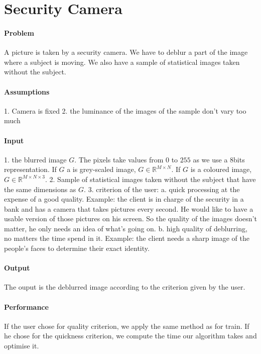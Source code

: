 \section{Security Camera}

\paragraph{Problem}
A picture is taken by a security camera. We have to deblur a part of the image where a subject is moving. We also have a sample of statistical images taken without the subject.

\paragraph{Assumptions}
1. Camera is fixed 2. the luminance of the images of the sample don't vary too much

\paragraph{Input}
1. the blurred image $G$. The pixels take values from $0$ to $255$ as we use a 8bits representation. If $G$ a is grey-scaled image, $G \in \mathbb{R}^{M \times N}$. If $G$ is a coloured image, $G \in \mathbb{R}^{M \times N \times 3}$. 2. Sample of statistical images taken without the subject that have the same dimensions as $G$. 3. criterion of the user: a. quick processing at the expense of a good quality. Example: the client is in charge of the security in a bank and has a camera that takes pictures every second. He would like to have a usable version of those pictures on his screen. So the quality of the images doesn't matter, he only needs an idea of what's going on. b. high quality of deblurring, no matters the time spend in it. Example: the client needs a sharp image of the people's faces to determine their exact identity.

\paragraph{Output}
The ouput is the deblurred image according to the criterion given by the user.

\paragraph{Performance}
If the user chose for quality criterion, we apply the same method as for train. If he chose for the quickness criterion, we compute the time our algorithm takes and optimise it. 



